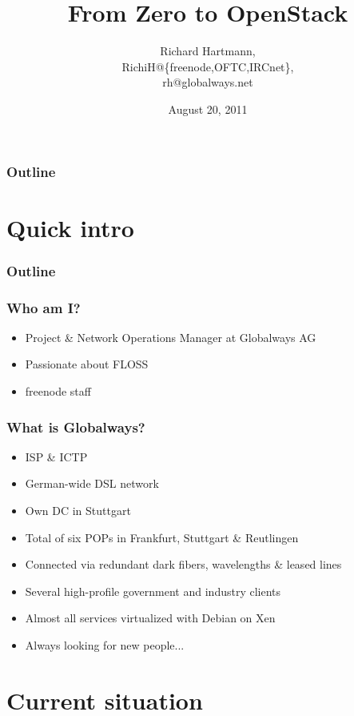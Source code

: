 \documentclass[t]{beamer}
\title{From Zero to OpenStack}
\author{Richard Hartmann,\\
RichiH@\{freenode,OFTC,IRCnet\},\\
rh@globalways.net}
\institute{Globalways AG}
\date{August 20, 2011}
\begin{document}
\begin{frame}
	\titlepage
\end{frame}

\begin{frame}
	\frametitle{Outline}
	\tableofcontents
\end{frame}


\section{Quick intro}

\begin{frame}
	\frametitle{Outline}
	\tableofcontents[currentsection]
\end{frame}

\begin{frame}
	\frametitle{Who am I?}
	\begin{itemize}
		\item Project \& Network Operations Manager at Globalways AG
		\item Passionate about FLOSS
		\item freenode staff
	\end{itemize}
\end{frame}

\begin{frame}
	\frametitle{What is Globalways?}
	\begin{itemize}
		\item ISP \& ICTP
		\item German-wide DSL network
		\item Own DC in Stuttgart
		\item Total of six POPs in Frankfurt, Stuttgart \& Reutlingen
		\item Connected via redundant dark fibers, wavelengths \& leased lines
		\item Several high-profile government and industry clients
		\item Almost all services virtualized with Debian on Xen
		\item Always looking for new people...
	\end{itemize}
\end{frame}


\section{Current situation}
\end{document}
